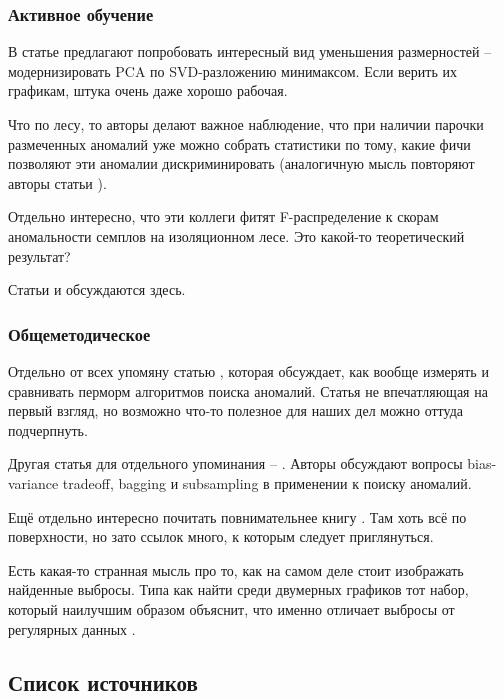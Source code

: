 \documentclass[12pt]{article}
\begin{document}
\subsubsection*{Активное обучение}

В статье
\cite{pugginiEnhancedVariableSelection2018}
предлагают попробовать интересный вид
уменьшения размерностей -- модернизировать PCA по SVD-разложению минимаксом.
Если верить их графикам, штука очень даже хорошо рабочая.

Что по лесу, то 
авторы делают важное наблюдение, что при наличии парочки размеченных аномалий уже
можно собрать статистики по тому, какие фичи позволяют эти аномалии дискриминировать
(аналогичную мысль повторяют авторы статьи
\cite{gavaiDetectingInsiderThreat2015}
).

Отдельно интересно, что эти коллеги фитят F-распределение к скорам аномальности
семплов на изоляционном лесе. Это какой-то теоретический результат?

Статьи
\cite{siddiquiFeedbackGuidedAnomalyDiscovery2018}
и
\cite{dasIncorporatingExpertFeedback}
обсуждаются здесь.


\subsubsection*{Общеметодическое}

Отдельно от всех упомяну статью
\cite{camposEvaluationUnsupervisedOutlier2016}
, которая обсуждает, как вообще измерять и сравнивать перморм алгоритмов поиска
аномалий. Статья не впечатляющая на первый взгляд, но возможно что-то полезное
для наших дел можно оттуда подчерпнуть.

Другая статья для отдельного упоминания --
\cite{aggarwalTheoreticalFoundationsAlgorithms2015}
. Авторы обсуждают вопросы bias-variance tradeoff, bagging и subsampling в применении
к поиску аномалий.

Ещё отдельно интересно почитать повнимательнее книгу
\cite{aggarwalOutlierEnsembles2017}
. Там хоть всё по поверхности, но зато ссылок много, к которым следует приглянуться.

Есть какая-то странная мысль про то, как на самом деле стоит изображать найденные выбросы.
Типа как найти среди двумерных графиков тот набор, который наилучшим образом объяснит, что именно отличает выбросы от регулярных данных
\cite{guptaOutlierDetectionLookOut2019}
.

\subsection*{Список источников}
\printbibliography[heading=none]
\end{document}

